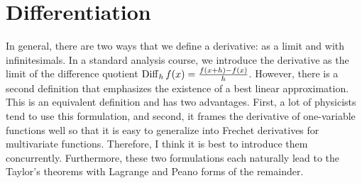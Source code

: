\section{Differentiation} 

  In general, there are two ways that we define a derivative: as a limit and with infinitesimals. In a standard analysis course, we introduce the derivative as the limit of the difference quotient $\operatorname{Diff}_h f(x) = \frac{f(x + h) - f(x)}{h}$. However, there is a second definition that emphasizes the existence of a best linear approximation. This is an equivalent definition and has two advantages. First, a lot of physicists tend to use this formulation, and second, it frames the derivative of one-variable functions well so that it is easy to generalize into Frechet derivatives for multivariate functions. Therefore, I think it is best to introduce them concurrently. Furthermore, these two formulations each naturally lead to the Taylor's theorems with Lagrange and Peano forms of the remainder. 

